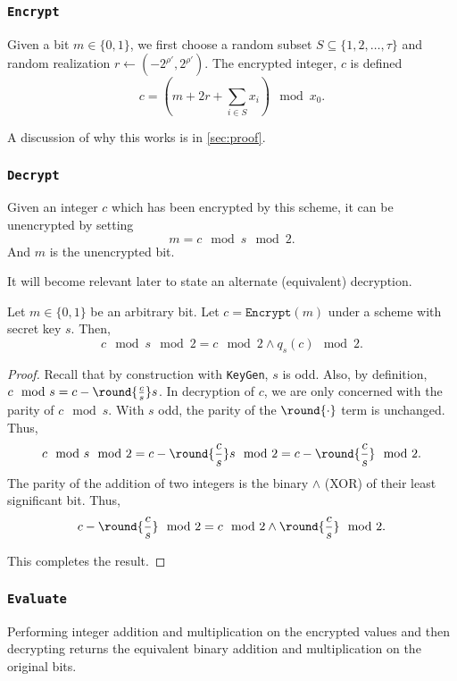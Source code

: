 \documentclass[a4paper,11pt, oneside]{article}
\begin{document}
\subsubsection{\texttt{Encrypt}}

Given a bit $m\in\{0,1\}$, we first choose a random subset $S\subseteq \{1,2,\dots,\tau\}$ and random realization $r\leftarrow (-2^{\rho'},2^{\rho'})$.  The encrypted integer, $c$ is defined
\[c = \left( m+2r + \sum_{i\in S}x_i \right)\mod{x_0}.\]

A discussion of why this works is in \ref{sec:proof}.

\subsubsection{\texttt{Decrypt}}
Given an integer $c$ which has been encrypted by this scheme, it can be unencrypted by setting
\[m = c\mod{s}\mod{2}.\]
And $m$ is the unencrypted bit.

It will become relevant later to state an alternate (equivalent) decryption.

\begin{lemma}
    Let $m\in\{0,1\}$ be an arbitrary bit.  Let $c = \texttt{Encrypt}(m)$ under a scheme with secret key $s$.  Then, 
    \[
        c\mod{s}\mod{2} = c\mod{2} \wedge q_s(c)\mod{2}.\]
    \label{lem:alt}
\end{lemma}
\begin{proof}
    Recall that by construction with \texttt{KeyGen}, $s$ is odd.  Also, by definition, $c\mod{s} = c - \round{\frac{c}{s}}s$.  In decryption of $c$, we are only concerned with the parity of $c\mod{s}$.  With $s$ odd, the parity of the $\round{\cdot}$ term is unchanged.  Thus,
    \[c\mod{s}\mod{2} = c - \round{\frac{c}{s}}s\mod{2} = c - \round{\frac{c}{s}}\mod{2}.\]
    The parity of the addition of two integers is the binary $\wedge$ (XOR) of their least significant bit.  Thus,
    \[c - \round{\frac{c}{s}}\mod{2} = c\mod{2} \wedge \round{\frac{c}{s}}\mod{2}.\]

    This completes the result.
\end{proof}

\subsubsection{\texttt{Evaluate}}
Performing integer addition and multiplication on the encrypted values and then decrypting returns the equivalent binary addition and multiplication on the original bits.
\end{document}
